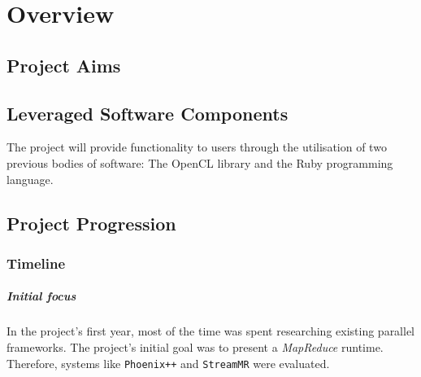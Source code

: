 \chapter{Overview}

\section{Project Aims}


\section{Leveraged Software Components}
The project will provide functionality to users through the utilisation of two previous bodies of software: The \ac{OpenCL} library and the Ruby programming language.





\section{Project Progression}
\subsection{Timeline}
\paragraph*{Initial focus}
In the project's first year, most of the time was spent researching existing parallel frameworks. The project's initial goal was to present a \emph{MapReduce} runtime. Therefore, systems like \verb|Phoenix++|\cite{phoenix++} and \verb|StreamMR|\cite{streammr} were evaluated.

